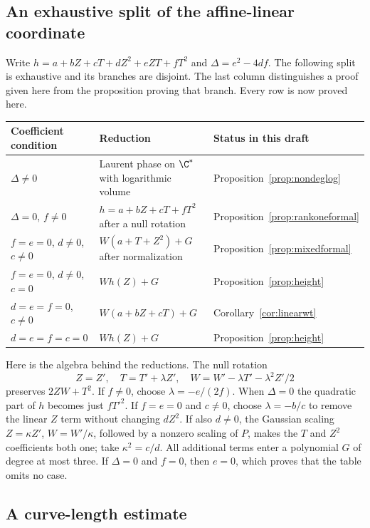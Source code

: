 \subsection{An exhaustive split of the affine-linear coordinate}\label{sec:wsplit}

Write $h=a+bZ+cT+dZ^2+eZT+fT^2$ and
$\Delta=e^2-4df$. The following split is exhaustive and its branches
are disjoint. The last column distinguishes a proof given here from
the proposition proving that branch. Every row is now proved here.

\begin{center}\small
\begin{tabular}{@{}p{}p{}p{}@{}}
\toprule
Coefficient condition & Reduction & Status in this draft\\
\midrule
$\Delta\ne0$ & Laurent phase on $\C^*$ with logarithmic volume &
Proposition~\ref{prop:nondeglog}\\[3pt]
$\Delta=0$, $f\ne0$ & $h=a+bZ+cT+fT^2$ after a null rotation &
Proposition~\ref{prop:rankoneformal}\\[3pt]
$f=e=0$, $d\ne0$, $c\ne0$ &
$W(a+T+Z^2)+G$ after normalization &
Proposition~\ref{prop:mixedformal}\\[3pt]
$f=e=0$, $d\ne0$, $c=0$ & $Wh(Z)+G$ &
Proposition~\ref{prop:height}\\[3pt]
$d=e=f=0$, $c\ne0$ & $W(a+bZ+cT)+G$ &
Corollary~\ref{cor:linearwt}\\[3pt]
$d=e=f=c=0$ & $Wh(Z)+G$ &
Proposition~\ref{prop:height}\\
\bottomrule
\end{tabular}
\end{center}

Here is the algebra behind the reductions. The null rotation
\[
 Z=Z',\quad T=T'+\lambda Z',\quad
 W=W'-\lambda T'-\lambda^2Z'/2
\]
preserves $2ZW+T^2$. If $f\ne0$, choose $\lambda=-e/(2f)$.
When $\Delta=0$ the quadratic part of $h$ becomes just $fT'^2$.
If $f=e=0$ and $c\ne0$, choose $\lambda=-b/c$ to remove the
linear $Z$ term without changing $dZ^2$. If also $d\ne0$, the
Gaussian scaling $Z=\kappa Z'$, $W=W'/\kappa$, followed by a
nonzero scaling of $P$, makes the $T$ and $Z^2$ coefficients both
one; take $\kappa^2=c/d$. All additional terms enter a polynomial
$G$ of degree at most three. If $\Delta=0$ and $f=0$, then $e=0$,
which proves that the table omits no case.

\subsection{A curve-length estimate}


